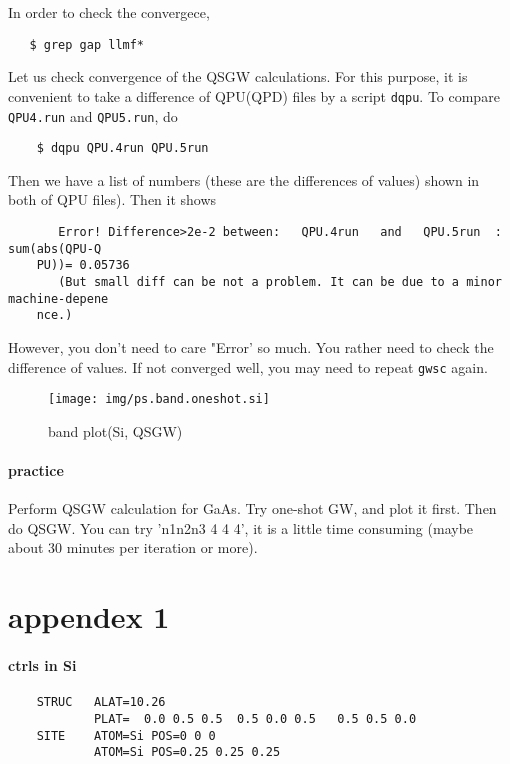 \documentclass[a4paper,10pt,epsf,fleqn]{article}
\begin{document}
In order to check the convergece, 
\begin{verbatim}
   $ grep gap llmf*
\end{verbatim}

Let us check convergence of the QSGW calculations.
For this purpose, it is convenient to take a difference of QPU(QPD) files
by a script \verb+dqpu+.
To compare \verb+QPU4.run+ and \verb+QPU5.run+, do
\begin{verbatim}
    $ dqpu QPU.4run QPU.5run
\end{verbatim}
Then we have a list of numbers (these are the differences of values)
shown in both of QPU files). Then it shows
\begin{verbatim}
       Error! Difference>2e-2 between:   QPU.4run   and   QPU.5run  :  sum(abs(QPU-Q
    PU))= 0.05736
       (But small diff can be not a problem. It can be due to a minor machine-depene
    nce.)
\end{verbatim}
However, you don't need to care "Error' so much. You rather need to
check the difference of values.
If not converged well, you may need to repeat 
\verb+gwsc+ again.

\begin{figure}[h]
 \begin{center}
  \texttt{[image: img/ps.band.oneshot.si]}
  \caption{band plot(Si, QSGW)}
 \end{center}
\end{figure}


\paragraph{practice}
Perform QSGW calculation for GaAs.
Try one-shot GW, and plot it first.
Then do QSGW. You can try 'n1n2n3 4 4 4', it is a little time
consuming (maybe about 30 minutes per iteration or more).

\section{appendex 1}
\paragraph{ctrls in Si}
\begin{verbatim}
    STRUC   ALAT=10.26
            PLAT=  0.0 0.5 0.5  0.5 0.0 0.5   0.5 0.5 0.0
    SITE    ATOM=Si POS=0 0 0
            ATOM=Si POS=0.25 0.25 0.25
\end{verbatim}
\end{document}
